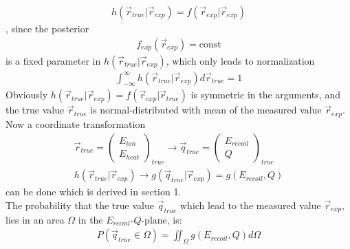 \begin{gather}
h(\vec{r}_{true} | \vec{r}_{exp}) = f(\vec{r}_{exp} | \vec{r}_{exp})
\end{gather}
, since the posterior 
\begin{gather}
f_{exp}(\vec{r}_{exp}) = \mbox{const}
\end{gather}
is a fixed parameter in $h(\vec{r}_{true} | \vec{r}_{exp})$,
which only leads to normalization
\begin{gather}
\int_{-\infty}^{\infty} h(\vec{r}_{true} | \vec{r}_{exp}) d \vec{r}_{true} = 1
\end{gather}
Obviously $h(\vec{r}_{true} | \vec{r}_{exp}) = f(\vec{r}_{exp} | \vec{r}_{true})$ is symmetric in the arguments, and the true value $\vec{r}_{true}$ is normal-distributed with mean of the measured value $\vec{r}_{exp}$.
Now a coordinate transformation 
\begin{gather}
\vec{r}_{true} = \begin{pmatrix} E_{ion} \\ E_{heat} \end{pmatrix}_{true} \rightarrow \vec{q}_{true} = \begin{pmatrix} E_{recoil} \\ Q \end{pmatrix}_{true} \\
h(\vec{r}_{true} | \vec{r}_{exp}) \rightarrow g(\vec{q}_{true} | \vec{r}_{exp}) = g(E_{recoil},Q)
\end{gather}
can be done which is derived in section 1. \\
The probability that the true value $\vec{q}_{true}$ which lead to the measured value $\vec{r}_{exp}$, lies in an area $\Omega$ in the $E_{recoil}$-$Q$-plane, is:
\begin{gather}
P(\vec{q}_{true} \in \Omega) = \iint_\Omega g(E_{recoil},Q) d\Omega
\end{gather}
